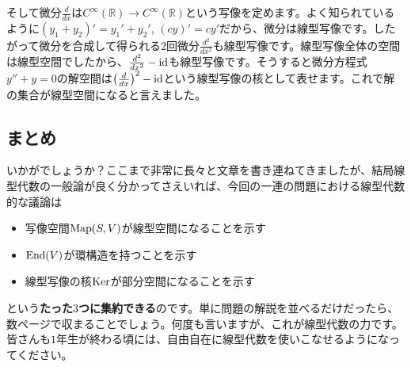 そして微分$\frac{d}{dx}$は$C^{\infty}(\mathbb{R}) \rightarrow C^{\infty}(\mathbb{R})$という写像を定めます。よく知られているように$(y_1 + y_2)' = y_1' + y_2'$, $(cy)' = cy'$だから、微分は線型写像です。したがって微分を合成して得られる$2$回微分$\frac{d^2}{dx^2}$も線型写像です。線型写像全体の空間は線型空間でしたから、$\frac{d^2}{dx^2}-\operatorname{id}$も線型写像です。そうすると微分方程式$y'' + y = 0$の解空間は$\bigl(\frac{d}{dx}\bigr)^2 - \operatorname{id}$という線型写像の核として表せます。これで解の集合が線型空間になると言えました。

\subsection{まとめ}

いかがでしょうか？ここまで非常に長々と文章を書き連ねてきましたが、結局線型代数の一般論が良く分かってさえいれば、今回の一連の問題における線型代数的な議論は
\begin{itemize}
\item 写像空間$\operatorname{Map}(S, V)$が線型空間になることを示す
\item $\operatorname{End}(V)$が環構造を持つことを示す
\item 線型写像の核$\operatorname{Ker}$が部分空間になることを示す
\end{itemize}
という\textbf{たった$3$つに集約できる}のです。単に問題の解説を並べるだけだったら、数ページで収まることでしょう。何度も言いますが、これが線型代数の力です。皆さんも$1$年生が終わる頃には、自由自在に線型代数を使いこなせるようになってください。

